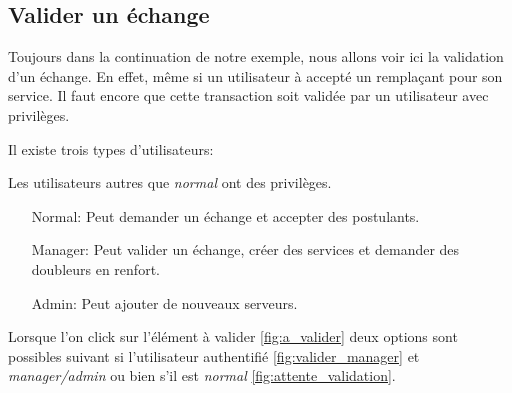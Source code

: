     \subsection*{Valider un échange}
    Toujours dans la continuation de notre exemple, nous allons voir ici 
    la validation d'un échange. En effet, même si un utilisateur
    à accepté un remplaçant pour son service. Il faut encore que cette
    transaction soit validée par un utilisateur avec privilèges.

    Il existe trois types d'utilisateurs:
    \begin{center}
    \end{center}

    Les utilisateurs autres que \textit{normal} ont des privilèges.

    \begin{itemize}
        \item [Normal:] Peut demander un échange et accepter des postulants.
        \item [Manager:] Peut valider un échange, créer des services et demander des doubleurs en renfort.
        \item [Admin:] Peut ajouter de nouveaux serveurs. 
    \end{itemize}
    
    \newpage
    Lorsque l'on click sur l'élément à valider \ref{fig:a_valider} deux options
    sont possibles suivant si l'utilisateur authentifié \ref{fig:valider_manager} et \textit{manager/admin} ou bien 
    s'il est \textit{normal} \ref{fig:attente_validation}.

